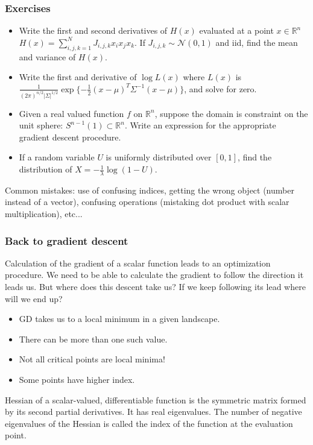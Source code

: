 \documentclass{beamer}
\begin{document}

\begin{frame}
\frametitle{Exercises}
\begin{itemize}
    \item Write the first and second derivatives of $H(x)$ evaluated at a point $x\in \mathbb{R}^n$ $H(x)=\sum_{i,j,k=1}^N J_{i,j,k}x_i x_j x_k$. If $J_{i,j,k} \sim \mathcal{N}(0,1)$ and iid, find the mean and variance of $H(x)$.
    \item Write the first and derivative of $\log L(x)$ where $L(x)$ is $\frac{1}{(2\pi)^{n/2}|\Sigma|^{1/2}}\exp{\{-\frac{1}{2}(x-\mu)^T\Sigma^{-1}(x-\mu)\}}$, and solve for zero.
    \item Given a real valued function $f$ on $\mathbb{R}^n$, suppose the domain is constraint on the unit sphere: $S^{n-1}(1) \subset \mathbb{R}^n$. Write an expression for the appropriate gradient descent procedure.%
    \item If a random variable $U$ is uniformly distributed over $[0,1]$, find the distribution of $X=-\frac{1}{\lambda}\log(1-U)$.
\end{itemize}
Common mistakes: use of confusing indices, getting the wrong object (number instead of a vector), confusing operations (mistaking dot product with scalar multiplication), etc...
\end{frame}


\begin{frame}
\frametitle{Back to gradient descent}
\begin{block}{}
Calculation of the gradient of a scalar function leads to an optimization procedure. We need to be able to calculate the gradient to follow the direction it leads us. But where does this descent take us? If we keep following its lead where will we end up?
\end{block}
\begin{itemize}
    \item GD takes us to a local minimum in a given landscape.
    \item There can be more than one such value.
    \item Not all critical points are local minima!
    \item Some points have higher index.
\end{itemize}
Hessian of a scalar-valued, differentiable function is the symmetric matrix formed by its second partial derivatives. It has real eigenvalues. The number of negative eigenvalues of the Hessian is called the index of the function at the evaluation point.

\end{frame}
\end{document}
